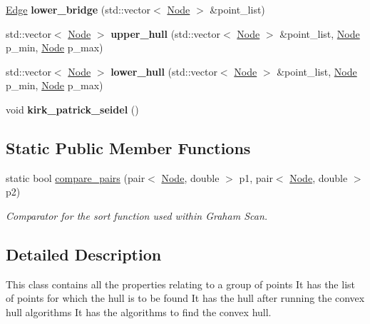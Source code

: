 \begin{DoxyCompactItemize}
\item 
\mbox{\label{classGraph_abb8152da6c3a5ded65c88e33d587bf3f}} 
\hyperlink{classEdge}{Edge} {\bfseries lower\+\_\+bridge} (std\+::vector$<$ \hyperlink{classNode}{Node} $>$ \&point\+\_\+list)
\item 
\mbox{\label{classGraph_a8ba642e6f2e4b781b1e069de0a00cd47}} 
std\+::vector$<$ \hyperlink{classNode}{Node} $>$ {\bfseries upper\+\_\+hull} (std\+::vector$<$ \hyperlink{classNode}{Node} $>$ \&point\+\_\+list, \hyperlink{classNode}{Node} p\+\_\+min, \hyperlink{classNode}{Node} p\+\_\+max)
\item 
\mbox{\label{classGraph_a07f61e4cbf5540ef83bb33b19bc44068}} 
std\+::vector$<$ \hyperlink{classNode}{Node} $>$ {\bfseries lower\+\_\+hull} (std\+::vector$<$ \hyperlink{classNode}{Node} $>$ \&point\+\_\+list, \hyperlink{classNode}{Node} p\+\_\+min, \hyperlink{classNode}{Node} p\+\_\+max)
\item 
\mbox{\label{classGraph_a7b1b09417dc55e2b03e0e06feb6d99cc}} 
void {\bfseries kirk\+\_\+patrick\+\_\+seidel} ()
\end{DoxyCompactItemize}
\subsection*{Static Public Member Functions}
\begin{DoxyCompactItemize}
\item 
static bool \hyperlink{classGraph_ad0d59e9ffd312e3af8bb37f567da3320}{compare\+\_\+pairs} (pair$<$ \hyperlink{classNode}{Node}, double $>$ p1, pair$<$ \hyperlink{classNode}{Node}, double $>$ p2)
\begin{DoxyCompactList}\small\item\em Comparator for the sort function used within Graham Scan. \end{DoxyCompactList}\end{DoxyCompactItemize}


\subsection{Detailed Description}
This class contains all the properties relating to a group of points It has the list of points for which the hull is to be found It has the hull after running the convex hull algorithms It has the algorithms to find the convex hull. 

